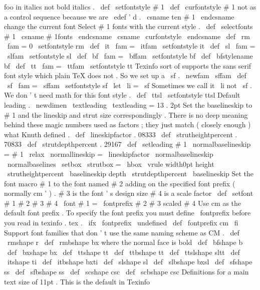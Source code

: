 {foo
in
%
italics
not
bold
italics
.
%
\
def
\
setfontstyle
#
1
{
%
\
def
\
curfontstyle
{
#
1
}
%
not
as
a
control
sequence
because
we
are
\
edef
'
d
.
\
csname
ten
#
1
\
endcsname
%
change
the
current
font
}
%
Select
#
1
fonts
with
the
current
style
.
%
\
def
\
selectfonts
#
1
{
\
csname
#
1fonts
\
endcsname
\
csname
\
curfontstyle
\
endcsname
}
\
def
\
rm
{
\
fam
=
0
\
setfontstyle
{
rm
}
}
\
def
\
it
{
\
fam
=
\
itfam
\
setfontstyle
{
it
}
}
\
def
\
sl
{
\
fam
=
\
slfam
\
setfontstyle
{
sl
}
}
\
def
\
bf
{
\
fam
=
\
bffam
\
setfontstyle
{
bf
}
}
\
def
\
bfstylename
{
bf
}
\
def
\
tt
{
\
fam
=
\
ttfam
\
setfontstyle
{
tt
}
}
%
Texinfo
sort
of
supports
the
sans
serif
font
style
which
plain
TeX
does
not
.
%
So
we
set
up
a
\
sf
.
\
newfam
\
sffam
\
def
\
sf
{
\
fam
=
\
sffam
\
setfontstyle
{
sf
}
}
\
let
\
li
=
\
sf
%
Sometimes
we
call
it
\
li
not
\
sf
.
%
We
don
'
t
need
math
for
this
font
style
.
\
def
\
ttsl
{
\
setfontstyle
{
ttsl
}
}
%
Default
leading
.
\
newdimen
\
textleading
\
textleading
=
13
.
2pt
%
Set
the
baselineskip
to
#
1
and
the
lineskip
and
strut
size
%
correspondingly
.
There
is
no
deep
meaning
behind
these
magic
numbers
%
used
as
factors
;
they
just
match
(
closely
enough
)
what
Knuth
defined
.
%
\
def
\
lineskipfactor
{
.
08333
}
\
def
\
strutheightpercent
{
.
70833
}
\
def
\
strutdepthpercent
{
.
29167
}
%
\
def
\
setleading
#
1
{
%
\
normalbaselineskip
=
#
1
\
relax
\
normallineskip
=
\
lineskipfactor
\
normalbaselineskip
\
normalbaselines
\
setbox
\
strutbox
=
\
hbox
{
%
\
vrule
width0pt
height
\
strutheightpercent
\
baselineskip
depth
\
strutdepthpercent
\
baselineskip
}
%
}
%
Set
the
font
macro
#
1
to
the
font
named
#
2
adding
on
the
%
specified
font
prefix
(
normally
cm
'
)
.
%
#
3
is
the
font
'
s
design
size
#
4
is
a
scale
factor
\
def
\
setfont
#
1
#
2
#
3
#
4
{
\
font
#
1
=
\
fontprefix
#
2
#
3
scaled
#
4
}
%
Use
cm
as
the
default
font
prefix
.
%
To
specify
the
font
prefix
you
must
define
\
fontprefix
%
before
you
read
in
texinfo
.
tex
.
\
ifx
\
fontprefix
\
undefined
\
def
\
fontprefix
{
cm
}
\
fi
%
Support
font
families
that
don
'
t
use
the
same
naming
scheme
as
CM
.
\
def
\
rmshape
{
r
}
\
def
\
rmbshape
{
bx
}
%
where
the
normal
face
is
bold
\
def
\
bfshape
{
b
}
\
def
\
bxshape
{
bx
}
\
def
\
ttshape
{
tt
}
\
def
\
ttbshape
{
tt
}
\
def
\
ttslshape
{
sltt
}
\
def
\
itshape
{
ti
}
\
def
\
itbshape
{
bxti
}
\
def
\
slshape
{
sl
}
\
def
\
slbshape
{
bxsl
}
\
def
\
sfshape
{
ss
}
\
def
\
sfbshape
{
ss
}
\
def
\
scshape
{
csc
}
\
def
\
scbshape
{
csc
}
%
Definitions
for
a
main
text
size
of
11pt
.
This
is
the
default
in
%
Texinfo
}
